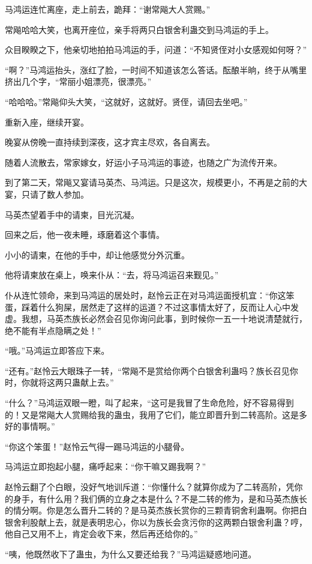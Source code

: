 \begin{this_body}
马鸿运连忙离座，走上前去，跪拜：“谢常飚大人赏赐。”

常飚哈哈大笑，也离开座位，亲手将两只白银舍利蛊交到马鸿运的手上。

众目睽睽之下，他亲切地拍拍马鸿运的手，问道：“不知贤侄对小女感观如何呀？”

“啊？”马鸿运抬头，涨红了脸，一时间不知道该怎么答话。酝酿半晌，终于从嘴里挤出几个字，“常丽小姐漂亮，很漂亮。”

“哈哈哈。”常飚仰头大笑，“这就好，这就好。贤侄，请回去坐吧。”

重新入座，继续开宴。

晚宴从傍晚一直持续到深夜，这才宾主尽欢，各自离去。

随着人流散去，常家嫁女，好运小子马鸿运的事迹，也随之广为流传开来。

到了第二天，常飚又宴请马英杰、马鸿运。只是这次，规模更小，不再是之前的大宴，只请了数人参加。

马英杰望着手中的请柬，目光沉凝。

回来之后，他一夜未睡，琢磨着这个事情。

小小的请柬，在他的手中，却让他感觉分外沉重。

他将请柬放在桌上，唤来仆从：“去，将马鸿运召来觐见。”

仆从连忙领命，来到马鸿运的居处时，赵怜云正在对马鸿运面授机宜：“你这笨蛋，踩着什么狗屎，居然走了这样的运道？不过这事情太好了，反而让人心中发虚。我想，马英杰族长必然会召见你询问此事，到时候你一五一十地说清楚就行，绝不能有半点隐瞒之处！”

“哦。”马鸿运立即答应下来。

“还有。”赵怜云大眼珠子一转，“常飚不是赏给你两个白银舍利蛊吗？族长召见你时，你就将这两只蛊献上去。”

“什么？”马鸿运双眼一瞪，叫了起来，“这可是我冒了生命危险，好不容易得到的！又是常飚大人赏赐给我的蛊虫，我用了它们，能立即晋升到二转高阶。这是多好的事情啊。”

“你这个笨蛋！”赵怜云气得一踢马鸿运的小腿骨。

马鸿运立即抱起小腿，痛呼起来：“你干嘛又踢我啊？”

赵怜云翻了个白眼，没好气地训斥道：“你懂什么？就算你成为了二转高阶，凭你的身手，有什么用？我们俩的立身之本是什么？不是二转的修为，是和马英杰族长的情分啊。你是怎么晋升二转的？是马英杰族长赏你的三颗青铜舍利蛊啊。你把白银舍利股献上去，就是表明忠心，你以为族长会贪污你的这两颗白银舍利蛊？哼，他自己又用不上，肯定会收下来，然后再还给你的。”

“咦，他既然收下了蛊虫，为什么又要还给我？”马鸿运疑惑地问道。


\end{this_body}
